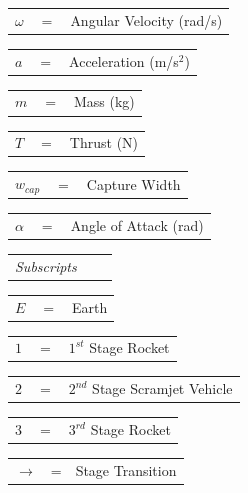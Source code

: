 \documentclass[journal]{new-aiaa}
\begin{document}
	  	\begin{tabular}{p{1.2cm}p{1cm}p{5cm}}
	  $\omega$ & $=$ & Angular Velocity (rad/s)\\
	  	\end{tabular} 
	  	\begin{tabular}{p{1.2cm}p{1cm}p{5cm}}
	  $a$ & $=$ & Acceleration (m/s$^2$)\\
	  	\end{tabular} 
	  	\begin{tabular}{p{1.2cm}p{1cm}p{5cm}}
	  $m$ & $=$ & Mass (kg)\\
	  	\end{tabular} 
	  	\begin{tabular}{p{1.2cm}p{1cm}p{5cm}}
	  $T$ & $=$ & Thrust (N)\\
	  	\end{tabular} 
	  	\begin{tabular}{p{1.2cm}p{1cm}p{5cm}}
	  $w_{cap}$ & $=$ & Capture Width\\
	  	\end{tabular} 
	  	\begin{tabular}{p{1.2cm}p{1cm}p{5cm}}
	  		$\alpha$ & $=$ & Angle of Attack (rad)\\
	  	\end{tabular} 	
	  	\newline  	
	  	\begin{tabular}{p{5.2cm}p{1cm}p{5cm}}


\textit{Subscripts} \\
\end{tabular} 
\newline
\begin{tabular}{p{1.2cm}p{1cm}p{5cm}}
	$E$ & $=$ & Earth\\
	
\end{tabular} 
\begin{tabular}{p{1.2cm}p{1cm}p{5cm}}
$1$ & $=$ & $1^{st}$ Stage Rocket\\
\end{tabular} 
\begin{tabular}{p{1.2cm}p{1cm}p{5cm}}
	$2$ & $=$ & $2^{nd}$ Stage Scramjet Vehicle\\
		\end{tabular} 
		\begin{tabular}{p{1.2cm}p{1cm}p{5cm}}
	$3$ & $=$ & $3^{rd}$ Stage Rocket\\
		\end{tabular} 
		\begin{tabular}{p{1.2cm}p{1cm}p{5cm}}
	$\rightarrow$ & = & Stage Transition\\
		\end{tabular} 
\end{document}
